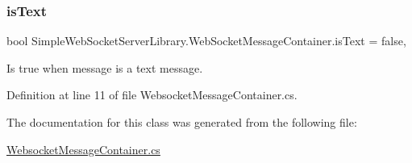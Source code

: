 \subsubsection{\texorpdfstring{is\+Text}{isText}}
{\footnotesize\ttfamily bool Simple\+Web\+Socket\+Server\+Library.\+Web\+Socket\+Message\+Container.\+is\+Text = false\hspace{0.3cm}{\ttfamily [get]}, {\ttfamily [set]}}



Is true when message is a text message. 



Definition at line 11 of file Websocket\+Message\+Container.\+cs.



The documentation for this class was generated from the following file\+:\begin{DoxyCompactItemize}
\item 
\mbox{\hyperlink{_websocket_message_container_8cs}{Websocket\+Message\+Container.\+cs}}\end{DoxyCompactItemize}
